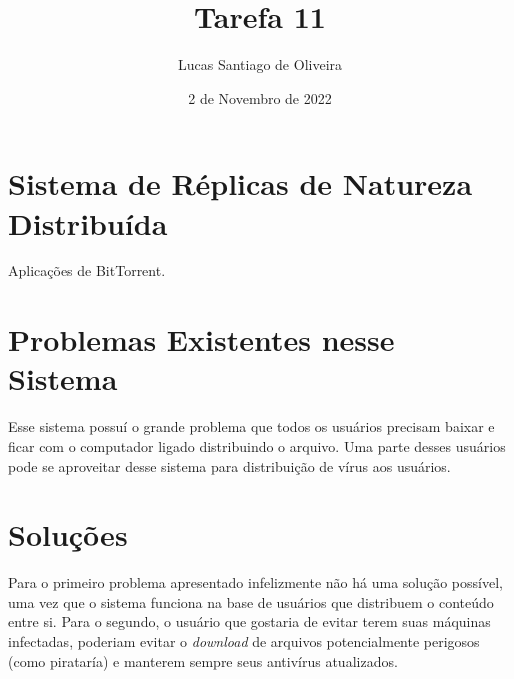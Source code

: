 \documentclass{article}
\title{Tarefa 11}
\author{Lucas Santiago de Oliveira}
\date{2 de Novembro de 2022}
\begin{document}
    \maketitle

    \section*{Sistema de Réplicas de Natureza Distribuída}
    Aplicações de {BitTorrent}.

    \section*{Problemas Existentes nesse Sistema}
    Esse sistema possuí o grande problema que todos os usuários precisam baixar e ficar com o computador
    ligado distribuindo o arquivo. Uma parte desses usuários pode se aproveitar desse sistema para distribuição 
    de vírus aos usuários.

    \section*{Soluções}
    Para o primeiro problema apresentado infelizmente não há uma solução possível, uma vez que o sistema funciona
    na base de usuários que distribuem o conteúdo entre si. Para o segundo, o usuário que gostaria de evitar
    terem suas máquinas infectadas, poderiam evitar o \emph{download} de arquivos potencialmente perigosos (como 
    pirataría) e manterem sempre seus antivírus atualizados.
\end{document}
